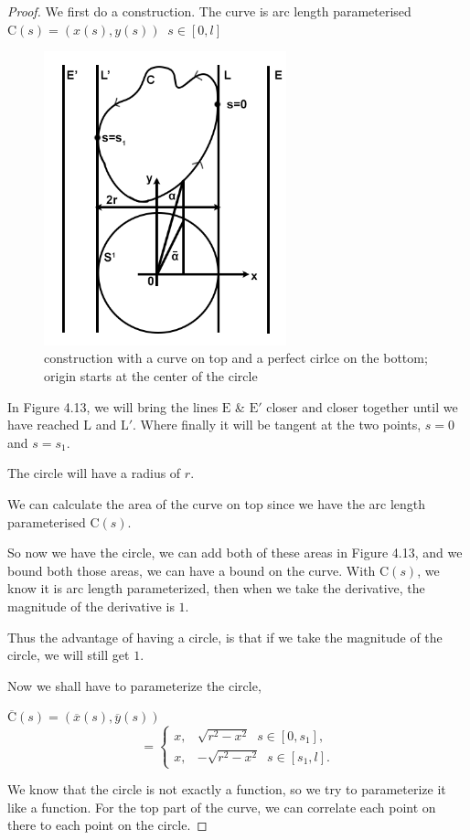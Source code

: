 \documentclass[a4paper]{book}
\numberwithin{theorem}{section}%
\begin{document}
\begin{proof}
    We first do a construction. The curve is arc length parameterised $\displaystyle \mathrm{C}(s)=(x(s),y(s))\;\;s\in[0,l]$
    \begin{figure}[hbt!]
        \begin{center}   
            \includegraphics[width=70mm]{esfigure}
            \caption{construction with a curve on top and a perfect cirlce on the bottom; origin starts at the center of the circle}
        \end{center}
    \end{figure}\leavevmode
    \newline
    In Figure 4.13, we will bring the lines $\mathrm{E}$ \& $\mathrm{E}'$ closer and closer together until we have reached $\mathrm{L}$ and $\mathrm{L}'$. Where finally it will be tangent at the two points, $s=0$ and $s=s_{1}$. 

    The circle will have a radius of $r$. 

    We can calculate the area of the curve on top since we have the arc length parameterised $\mathrm{C}(s)$.

    So now we have the circle, we can add both of these areas in Figure 4.13, and we bound both those areas, we can have a bound on the curve. With $\mathrm{C}(s)$, we know it is arc length parameterized, then when we take the derivative, the magnitude of the derivative is $1$. 

    Thus the advantage of having a circle, is that if we take the magnitude of the circle, we will still get $1$.

    Now we shall have to parameterize the circle,
    \begin{center}
        $\displaystyle \overline{\mathrm{C}}(s)=(\overline{x}(s),\overline{y}(s))$
        \begin{equation*}
            =\begin{cases}
                x, & \sqrt{r^{2}-x^{2}}\;\;s\in[0,s_{1}],\\
                x, & -\sqrt{r^{2}-x^{2}}\;\;s\in[s_{1},l].
            \end{cases}
        \end{equation*}
    \end{center}\leavevmode
    We know that the circle is not exactly a function, so we try to parameterize it like a function. For the top part of the curve, we can correlate each point on there to each point on the circle.


\end{proof}
\end{document}

